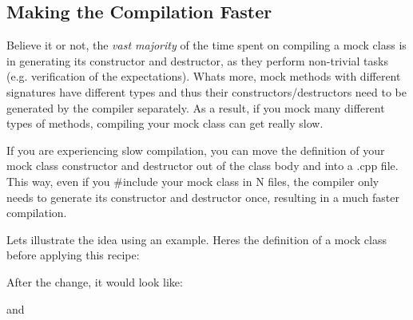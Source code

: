 \subsection*{Making the Compilation Faster}

Believe it or not, the {\itshape vast majority} of the time spent on compiling a mock class is in generating its constructor and destructor, as they perform non-\/trivial tasks (e.\+g. verification of the expectations). What\textquotesingle{}s more, mock methods with different signatures have different types and thus their constructors/destructors need to be generated by the compiler separately. As a result, if you mock many different types of methods, compiling your mock class can get really slow.

If you are experiencing slow compilation, you can move the definition of your mock class\textquotesingle{} constructor and destructor out of the class body and into a {\ttfamily .cpp} file. This way, even if you {\ttfamily \#include} your mock class in N files, the compiler only needs to generate its constructor and destructor once, resulting in a much faster compilation.

Let\textquotesingle{}s illustrate the idea using an example. Here\textquotesingle{}s the definition of a mock class before applying this recipe\+:


\begin{DoxyCode}{0}
\DoxyCodeLine{}
\DoxyCodeLine{\};}
\end{DoxyCode}


After the change, it would look like\+:


\begin{DoxyCode}{0}
\DoxyCodeLine{}
\DoxyCodeLine{\};}
\end{DoxyCode}
 and 
\begin{DoxyCode}{0}
\DoxyCodeLine{}
\end{DoxyCode}


